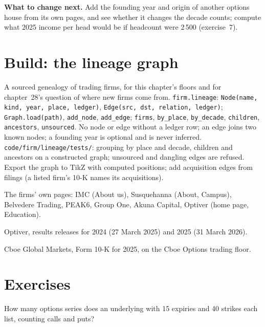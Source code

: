 \textbf{What to change next.} Add the founding year and origin of another options house from its own pages, and see
whether it changes the decade counts; compute what 2025 income per head would be if headcount were 2\,500
(exercise~7).

\section{Build: the lineage graph}\label{bld:in:the-options-market-making-houses:lineage}

\begin{build}
 A sourced genealogy of trading firms, for this chapter's floors and for chapter~28's question of where
new firms come from.
 \texttt{firm.lineage}: \texttt{Node(name, kind, year, place, ledger)}, \texttt{Edge(src, dst,
relation, ledger)}; \texttt{Graph.load(path)}, \texttt{add\_node}, \texttt{add\_edge}; \texttt{firms}, \texttt{by\_place},
\texttt{by\_decade}, \texttt{children}, \texttt{ancestors}, \texttt{unsourced}.
 No node or edge without a ledger row; an edge joins two known nodes; a founding year is optional and is
never inferred.
 \texttt{code/firm/lineage/tests/}: grouping by place and decade, children and ancestors on a
constructed graph; unsourced and dangling edges are refused.
 Export the graph to TikZ with computed positions; add acquisition edges from filings (a listed firm's
10-K names its acquisitions).
\end{build}

\begin{omsources}
\item The firms' own pages: IMC (About us), Susquehanna (About, Campus), Belvedere Trading, PEAK6, Group One, Akuna
Capital, Optiver (home page, Education).
\item Optiver, results releases for 2024 (27 March 2025) and 2025 (31 March 2026).
\item Cboe Global Markets, Form 10-K for 2025, on the Cboe Options trading floor.
\end{omsources}

\section{Exercises}

\begin{exercise}[$\star$]\label{exo:in:the-options-market-making-houses:1}
How many options series does an underlying with 15 expiries and 40 strikes each list, counting calls and puts?
\end{exercise}

